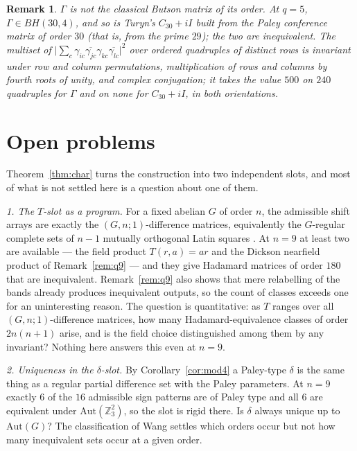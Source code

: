 \documentclass[11pt]{article}
\newtheorem{remark}{Remark}
\newcommand{\Z}{\mathbb Z}
\begin{document}
\begin{remark}\label{rem:c30}
\(\Gamma\) is not the classical Butson matrix of its order.  At \(q=5\),
\(\Gamma\in BH(30,4)\), and so is Turyn's \(C_{30}+iI\) built from the Paley
conference matrix of order \(30\) (that is, from the prime \(29\)); the two
are inequivalent.  The multiset of
\(\bigl|\sum_{c}\gamma_{ic}\overline{\gamma_{jc}}\gamma_{kc}
\overline{\gamma_{lc}}\bigr|^{2}\) over ordered quadruples of distinct rows
is invariant under row and column permutations, multiplication of rows and
columns by fourth roots of unity, and complex conjugation; it takes the
value \(500\) on \(240\) quadruples for \(\Gamma\) and on none for
\(C_{30}+iI\), in both orientations.
\end{remark}

\section{Open problems}\label{sec:open}

Theorem~\ref{thm:char} turns the construction into two independent slots, and
most of what is not settled here is a question about one of them.

\emph{1.  The \(T\)-slot as a program.}  For a fixed abelian \(G\) of order
\(n\), the admissible shift arrays are exactly the \((G,n;1)\)-difference
matrices, equivalently the \(G\)-regular complete sets of \(n-1\) mutually
orthogonal Latin squares \cite[Thm.~1]{Jungnickel1980}.  At \(n=9\) at least
two are available --- the field product \(T(r,a)=ar\) and the Dickson
nearfield product of Remark~\ref{rem:q9} --- and they give Hadamard
matrices of order \(180\) that are inequivalent.  Remark~\ref{rem:q9} also
shows that mere relabelling of the bands already produces inequivalent
outputs, so the count of classes exceeds one for an uninteresting reason.
The question is quantitative: as \(T\) ranges over all
\((G,n;1)\)-difference matrices, how many Hadamard-equivalence classes of
order \(2n(n+1)\) arise, and is the field choice distinguished among them by
any invariant?  Nothing here answers this even at \(n=9\).

\emph{2.  Uniqueness in the \(\delta\)-slot.}  By Corollary~\ref{cor:mod4} a
Paley-type \(\delta\) is the same thing as a regular partial difference set
with the Paley parameters.  At \(n=9\) exactly \(6\) of the \(16\) admissible
sign patterns are of Paley type and all \(6\) are equivalent under
\(\mathrm{Aut}(\Z_3^{2})\), so the slot is rigid there.  Is \(\delta\) always
unique up to \(\mathrm{Aut}(G)\)?  The classification of Wang \cite{Wang2020}
settles which orders occur but not how many inequivalent sets occur at a
given order.
\end{document}

